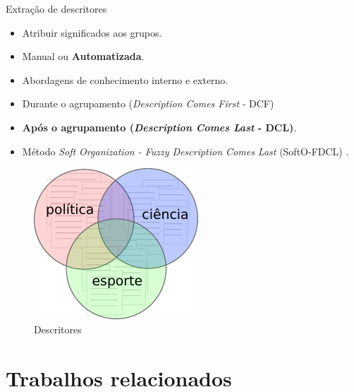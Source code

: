 \documentclass[brazil]{beamer}
\begin{document}
\begin{frame}{Extração de descritores}
  \begin{itemize}
    \item<1 -> Atribuir significados aos grupos. 
    \item<2 -> Manual ou \textbf{Automatizada}. 
    \item<3 -> Abordagens de conhecimento interno e externo.
    \item<4 -> Durante o agrupamento ({\it Description Comes First\/} - DCF) 
    \item<4 -> \textbf{Após o agrupamento ({\it Description Comes Last\/} - DCL)}.
    \item<5 -> Método {\it Soft Organization - Fuzzy Description Comes Last\/} (SoftO-FDCL)
      \cite{Nogueira2013}.
  \end{itemize} 
  \begin{figure}[!htp] 
    \centering 
    \includegraphics[width=0.4\columnwidth]{assets/descriptors.pdf}
    \caption{Descritores} 
  \end{figure}
\end{frame}


\section{Trabalhos relacionados}
\end{document}
